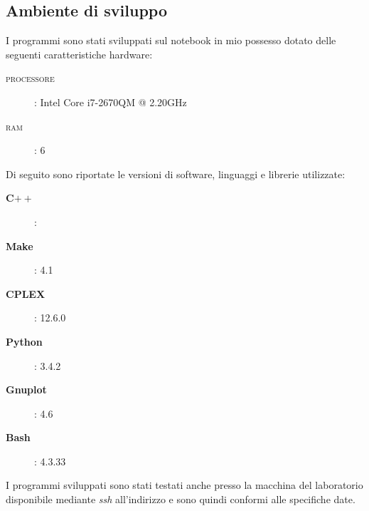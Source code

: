 \subsection{Ambiente di sviluppo}
\label{sec:ambiente}
I programmi sono stati sviluppati sul notebook in mio possesso dotato delle seguenti caratteristiche hardware:
\begin{description}
\item[\textsc{processore}]: Intel Core i7-2670QM @ 2.20GHz
\item[\textsc{ram}]: 6
\end{description}

Di seguito sono riportate le versioni di software, linguaggi e librerie utilizzate:
\begin{description}
\item[\textbf{C$++$}]: 
\item[\textbf{Make}]: 4.1
\item[\textbf{CPLEX}]: 12.6.0
\item[\textbf{Python}]: 3.4.2
\item[\textbf{Gnuplot}]: 4.6
\item[\textbf{Bash}]: 4.3.33
\end{description}

I programmi sviluppati sono stati testati anche presso la macchina del laboratorio disponibile mediante \emph{ssh} all'indirizzo  e sono quindi conformi alle specifiche date.